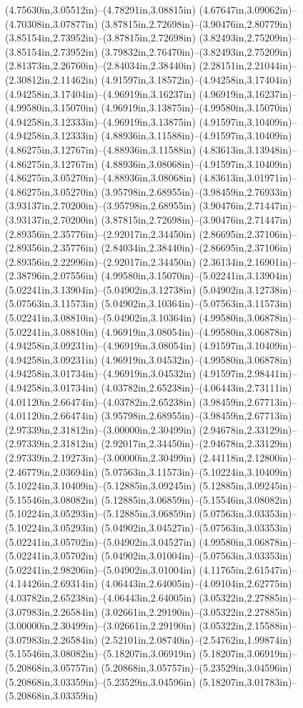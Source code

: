 (4.75630in,3.05512in)--(4.78291in,3.08815in) (4.67647in,3.09062in)--(4.70308in,3.07877in) (3.87815in,2.72698in)--(3.90476in,2.80779in) (3.85154in,2.73952in)--(3.87815in,2.72698in) (3.82493in,2.75209in)--(3.85154in,2.73952in) (3.79832in,2.76470in)--(3.82493in,2.75209in) (2.81373in,2.26760in)--(2.84034in,2.38440in) (2.28151in,2.21044in)--(2.30812in,2.11462in) (4.91597in,3.18572in)--(4.94258in,3.17404in) (4.94258in,3.17404in)--(4.96919in,3.16237in) (4.96919in,3.16237in)--(4.99580in,3.15070in) (4.96919in,3.13875in)--(4.99580in,3.15070in) (4.94258in,3.12333in)--(4.96919in,3.13875in) (4.91597in,3.10409in)--(4.94258in,3.12333in) (4.88936in,3.11588in)--(4.91597in,3.10409in) (4.86275in,3.12767in)--(4.88936in,3.11588in) (4.83613in,3.13948in)--(4.86275in,3.12767in) (4.88936in,3.08068in)--(4.91597in,3.10409in) (4.86275in,3.05270in)--(4.88936in,3.08068in) (4.83613in,3.01971in)--(4.86275in,3.05270in) (3.95798in,2.68955in)--(3.98459in,2.76933in) (3.93137in,2.70200in)--(3.95798in,2.68955in) (3.90476in,2.71447in)--(3.93137in,2.70200in) (3.87815in,2.72698in)--(3.90476in,2.71447in) (2.89356in,2.35776in)--(2.92017in,2.34450in) (2.86695in,2.37106in)--(2.89356in,2.35776in) (2.84034in,2.38440in)--(2.86695in,2.37106in) (2.89356in,2.22996in)--(2.92017in,2.34450in) (2.36134in,2.16901in)--(2.38796in,2.07556in) (4.99580in,3.15070in)--(5.02241in,3.13904in) (5.02241in,3.13904in)--(5.04902in,3.12738in) (5.04902in,3.12738in)--(5.07563in,3.11573in) (5.04902in,3.10364in)--(5.07563in,3.11573in) (5.02241in,3.08810in)--(5.04902in,3.10364in) (4.99580in,3.06878in)--(5.02241in,3.08810in) (4.96919in,3.08054in)--(4.99580in,3.06878in) (4.94258in,3.09231in)--(4.96919in,3.08054in) (4.91597in,3.10409in)--(4.94258in,3.09231in) (4.96919in,3.04532in)--(4.99580in,3.06878in) (4.94258in,3.01734in)--(4.96919in,3.04532in) (4.91597in,2.98441in)--(4.94258in,3.01734in) (4.03782in,2.65238in)--(4.06443in,2.73111in) (4.01120in,2.66474in)--(4.03782in,2.65238in) (3.98459in,2.67713in)--(4.01120in,2.66474in) (3.95798in,2.68955in)--(3.98459in,2.67713in) (2.97339in,2.31812in)--(3.00000in,2.30499in) (2.94678in,2.33129in)--(2.97339in,2.31812in) (2.92017in,2.34450in)--(2.94678in,2.33129in) (2.97339in,2.19273in)--(3.00000in,2.30499in) (2.44118in,2.12800in)--(2.46779in,2.03694in) (5.07563in,3.11573in)--(5.10224in,3.10409in) (5.10224in,3.10409in)--(5.12885in,3.09245in) (5.12885in,3.09245in)--(5.15546in,3.08082in) (5.12885in,3.06859in)--(5.15546in,3.08082in) (5.10224in,3.05293in)--(5.12885in,3.06859in) (5.07563in,3.03353in)--(5.10224in,3.05293in) (5.04902in,3.04527in)--(5.07563in,3.03353in) (5.02241in,3.05702in)--(5.04902in,3.04527in) (4.99580in,3.06878in)--(5.02241in,3.05702in) (5.04902in,3.01004in)--(5.07563in,3.03353in) (5.02241in,2.98206in)--(5.04902in,3.01004in) (4.11765in,2.61547in)--(4.14426in,2.69314in) (4.06443in,2.64005in)--(4.09104in,2.62775in) (4.03782in,2.65238in)--(4.06443in,2.64005in) (3.05322in,2.27885in)--(3.07983in,2.26584in) (3.02661in,2.29190in)--(3.05322in,2.27885in) (3.00000in,2.30499in)--(3.02661in,2.29190in) (3.05322in,2.15588in)--(3.07983in,2.26584in) (2.52101in,2.08740in)--(2.54762in,1.99874in) (5.15546in,3.08082in)--(5.18207in,3.06919in) (5.18207in,3.06919in)--(5.20868in,3.05757in) (5.20868in,3.05757in)--(5.23529in,3.04596in) (5.20868in,3.03359in)--(5.23529in,3.04596in) (5.18207in,3.01783in)--(5.20868in,3.03359in) 
